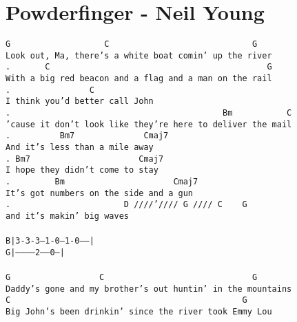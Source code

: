 \newpage
\section{Powderfinger - Neil Young}
\label{Powderfinger - Neil Young}
\texttt{G\ \ \ \ \ \ \ \ \ \ \ \ \ \ \ \ \ \ \ C\ \ \ \ \ \ \ \ \ \ \ \ \ \ \ \ \ \ \ \ \ \ \ \ \ \ \ \ \ G\\
Look\ out,\ Ma,\ there's\ a\ white\ boat\ comin'\ up\ the\ river\\
. \ \ \ \ \ \ C\ \ \ \ \ \ \ \ \ \ \ \ \ \ \ \ \ \ \ \ \ \ \ \ \ \ \ \ \ \ \ \ \ \ \ \ \ \ \ \ \ \ \ \ G\\
With\ a\ big\ red\ beacon\ and\ a\ flag\ and\ a\ man\ on\ the\ rail\\
. \ \ \ \ \ \ \ \ \ \ \ \ \ \ \ C\\
I\ think\ you'd\ better\ call\ John\\
. \ \ \ \ \ \ \ \ \ \ \ \ \ \ \ \ \ \ \ \ \ \ \ \ \ \ \ \ \ \ \ \ \ \ \ \ \ \ \ \ \ \ Bm\ \ \ \ \ \ \ \ \ \ \ C\\
'cause\ it\ don't\ look\ like\ they're\ here\ to\ deliver\ the\ mail\\
. \ \ \ \ \ \ \ \ \ Bm7\ \ \ \ \ \ \ \ \ \ \ \ \ \ Cmaj7\\
And\ it's\ less\ than\ a\ mile\ away\\
. Bm7\ \ \ \ \ \ \ \ \ \ \ \ \ \ \ \ \ \ \ \ \ \ Cmaj7\\
I\ hope\ they\ didn't\ come\ to\ stay\\
. \ \ \ \ \ \ \ \ Bm\ \ \ \ \ \ \ \ \ \ \ \ \ \ \ \ \ \ \ \ \ \ Cmaj7\\
It's\ got\ numbers\ on\ the\ side\ and\ a\ gun\\
. \ \ \ \ \ \ \ \ \ \ \ \ \ \ \ \ \ \ \ \ \ \ D\ ////'////\ G\ ////\ C\ \ \ \ G\\
and\ it's\ makin'\ big\ waves\\
\\
B|3-3-3--1-0---1-0-----|\\
G|-----------2-----0---|\\
\\
G\ \ \ \ \ \ \ \ \ \ \ \ \ \ \ \ \ \ C\ \ \ \ \ \ \ \ \ \ \ \ \ \ \ \ \ \ \ \ \ \ \ \ \ \ \ \ \ \ G\\
Daddy's\ gone\ and\ my\ brother's\ out\ huntin'\ in\ the\ mountains\\
C\ \ \ \ \ \ \ \ \ \ \ \ \ \ \ \ \ \ \ \ \ \ \ \ \ \ \ \ \ \ \ \ \ \ \ \ \ \ \ \ \ \ \ \ \ \ \ G\\
Big\ John's\ been\ drinkin'\ since\ the\ river\ took\ Emmy\ Lou\\
}
